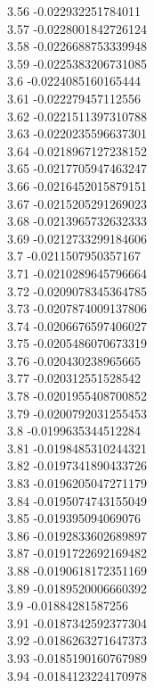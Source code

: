 {3.56	-0.022932251784011\\
3.57	-0.0228001842726124\\
3.58	-0.0226688753339948\\
3.59	-0.0225383206731085\\
3.6	-0.0224085160165444\\
3.61	-0.022279457112556\\
3.62	-0.0221511397310788\\
3.63	-0.0220235596637301\\
3.64	-0.0218967127238152\\
3.65	-0.0217705947463247\\
3.66	-0.0216452015879151\\
3.67	-0.0215205291269023\\
3.68	-0.0213965732632333\\
3.69	-0.0212733299184606\\
3.7	-0.0211507950357167\\
3.71	-0.0210289645796664\\
3.72	-0.0209078345364785\\
3.73	-0.0207874009137806\\
3.74	-0.0206676597406027\\
3.75	-0.0205486070673319\\
3.76	-0.020430238965665\\
3.77	-0.020312551528542\\
3.78	-0.0201955408700852\\
3.79	-0.0200792031255453\\
3.8	-0.0199635344512284\\
3.81	-0.0198485310244321\\
3.82	-0.0197341890433726\\
3.83	-0.0196205047271179\\
3.84	-0.0195074743155049\\
3.85	-0.019395094069076\\
3.86	-0.0192833602689897\\
3.87	-0.0191722692169482\\
3.88	-0.0190618172351169\\
3.89	-0.0189520006660392\\
3.9	-0.01884281587256\\
3.91	-0.0187342592377304\\
3.92	-0.0186263271647373\\
3.93	-0.0185190160767989\\
3.94	-0.0184123224170978\\
}
